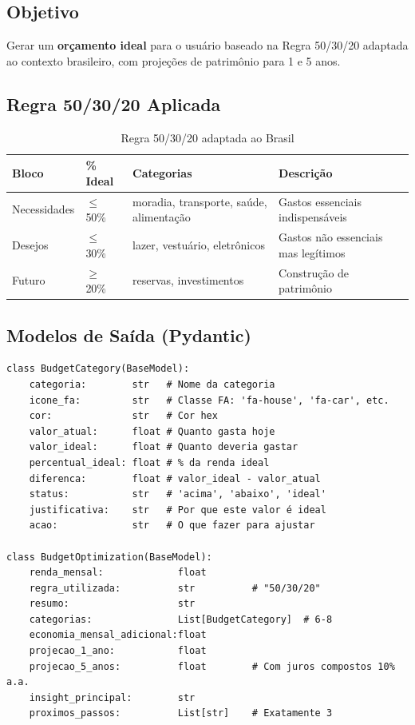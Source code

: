 \documentclass[12pt, a4paper, oneside]{report}
\begin{document}
\subsection{Objetivo}

Gerar um \textbf{orçamento ideal} para o usuário baseado na Regra 50/30/20 adaptada ao contexto brasileiro, com projeções de patrimônio para 1 e 5 anos.

\subsection{Regra 50/30/20 Aplicada}

\begin{table}[H]
\centering
\caption{Regra 50/30/20 adaptada ao Brasil}
\begin{tabularx}{\textwidth}{l l l X}
\toprule
Bloco & \% Ideal & Categorias & Descrição \\
\midrule
Necessidades & $\leq$ 50\% & moradia, transporte, saúde, alimentação & Gastos essenciais indispensáveis \\
Desejos & $\leq$ 30\% & lazer, vestuário, eletrônicos & Gastos não essenciais mas legítimos \\
Futuro & $\geq$ 20\% & reservas, investimentos & Construção de patrimônio \\
\bottomrule
\end{tabularx}
\end{table}

\subsection{Modelos de Saída (Pydantic)}

\begin{lstlisting}[style=python, caption={finance/budget\_optimizer.py — Modelos Pydantic}]
class BudgetCategory(BaseModel):
    categoria:        str   # Nome da categoria
    icone_fa:         str   # Classe FA: 'fa-house', 'fa-car', etc.
    cor:              str   # Cor hex
    valor_atual:      float # Quanto gasta hoje
    valor_ideal:      float # Quanto deveria gastar
    percentual_ideal: float # % da renda ideal
    diferenca:        float # valor_ideal - valor_atual
    status:           str   # 'acima', 'abaixo', 'ideal'
    justificativa:    str   # Por que este valor é ideal
    acao:             str   # O que fazer para ajustar

class BudgetOptimization(BaseModel):
    renda_mensal:             float
    regra_utilizada:          str          # "50/30/20"
    resumo:                   str
    categorias:               List[BudgetCategory]  # 6-8
    economia_mensal_adicional:float
    projecao_1_ano:           float
    projecao_5_anos:          float        # Com juros compostos 10% a.a.
    insight_principal:        str
    proximos_passos:          List[str]    # Exatamente 3
\end{lstlisting}
\end{document}
